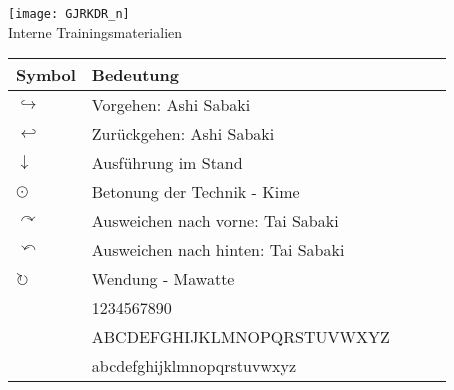 \setcounter{num}{0}
\setcounter{numz}{0}
\begin{tcolorbox}[width=\textwidth,height=\textheight,right=12pt,left=12pt,colframe=SGL2,colback=white,fonttitle=\bfseries,coltitle=black,title=Trainingskartensatz G\={o}j\={u}-Ry\={u} Karate-D\={o} Langenfeld-Reusrath]
	\null\vfill\null	
	\begin{center}
		\texttt{[image: GJRKDR\_n]}\\
		Interne Trainingsmaterialien
	\end{center}
\end{tcolorbox}
\clearpage
\pagebreak
\setcounter{num}{0}
\setcounter{numz}{0}	
\begin{tcolorbox}[width=\textwidth,height=\textheight,right=12pt,left=12pt,colframe=SGL2,colback=white,fonttitle=\bfseries,coltitle=black,title=Allgemeines:\indent Erläuterungen]
	\null\vfill\null
	\begin{tabularx}{\textwidth}{lllll}
		Symbol	& Bedeutung	& &&\\
		\midrule
		\(\hookrightarrow\) 	& Vorgehen: Ashi Sabaki					& & &\\
		\(\hookleftarrow\) 		& Zurückgehen: Ashi Sabaki				& & &\\
		\(\downarrow\) 			& Ausführung im Stand					& & &\\
		\(\odot\) 				& Betonung der Technik - Kime			& & &\\
		\(\curvearrowright\)	& Ausweichen nach vorne: Tai Sabaki		& & &\\
		\(\curvearrowleft\)		& Ausweichen nach hinten: Tai Sabaki	& & &\\
		\(\circlearrowright\)	& Wendung - Mawatte						& & &\\
								& 1234567890							& &	&\\
								& ABCDEFGHIJKLMNOPQRSTUVWXYZ			& & &\\
								& abcdefghijklmnopqrstuvwxyz			& & &\\
	\end{tabularx}\null\vfill\null
\end{tcolorbox}
\clearpage
\pagebreak
